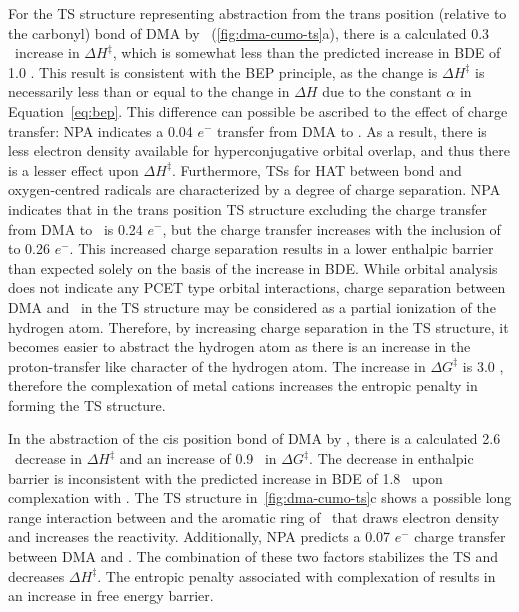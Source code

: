 For the TS structure representing abstraction from the trans position (relative
to the carbonyl)  bond of DMA by \cumo\ (\ref{fig:dma-cumo-ts}a), there
is a calculated 0.3 \kcalmol\ increase in $\Delta H^\ddagger$, which is somewhat
less than the predicted increase in BDE of 1.0 \kcalmol. This result is
consistent with the BEP principle, as the change is $\Delta H^\ddagger$ is
necessarily less than or equal to the change in $\Delta H$ due to the constant
$\alpha$ in Equation~\ref{eq:bep}. This difference can possible be ascribed to
the effect of charge transfer: NPA indicates a 0.04 $e^-$ transfer from DMA to
. As a result, there is less electron density available for
hyperconjugative orbital overlap, and thus there is a lesser effect upon $\Delta
H^\ddagger$.  Furthermore, TSs for HAT between  bond and oxygen-centred
radicals are characterized by a degree of charge separation.\cite{Roberts1999}
NPA indicates that in the trans position TS structure excluding  the
charge transfer from DMA to \cumo\ is 0.24 $e^-$, but the charge transfer
increases with the inclusion of  to 0.26 $e^-$. This increased charge
separation results in a lower enthalpic barrier than expected solely on the
basis of the increase in  BDE. While orbital analysis does not indicate
any PCET type orbital interactions, charge separation between DMA and \cumo\ in
the TS structure may be considered as a partial ionization of the hydrogen atom.
Therefore, by increasing charge separation in the TS structure, it becomes
easier to abstract the hydrogen atom as there is an increase in the
proton-transfer like character of the hydrogen atom. The increase in $\Delta
G^\ddagger$ is 3.0 \kcalmol, therefore the complexation of metal cations
increases the entropic penalty in forming the TS structure.

In the abstraction of the cis position  bond of DMA by \cumo, there is a
calculated 2.6 \kcalmol\ decrease in $\Delta H^\ddagger$ and an increase of 0.9
\kcalmol\ in $\Delta G^\ddagger$. The decrease in enthalpic barrier is
inconsistent with the predicted increase in BDE of 1.8 \kcalmol\ upon
complexation with . The TS structure in~\ref{fig:dma-cumo-ts}c shows a
possible long range interaction between  and the aromatic ring of \cumo\
that draws electron density and increases the reactivity. Additionally, NPA
predicts a 0.07 $e^-$ charge transfer between DMA and \ch{Na}. The combination
of these two factors stabilizes the TS and decreases $\Delta H^\ddagger$. The
entropic penalty associated with complexation of \ch{NaCl} results in an
increase in free energy barrier.

